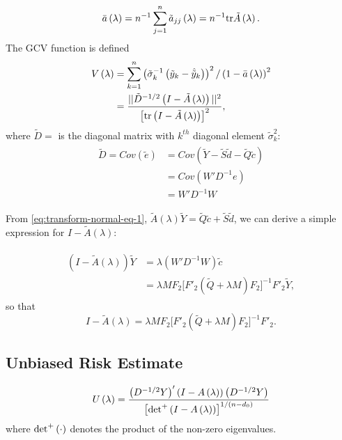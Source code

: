 \documentclass[12pt]{article}
\newcommand{\tildec}{\tilde{c}}
\newcommand{\tildeS}{\tilde{S}}
\newcommand{\tilded}{\tilde{d}}
\newcommand{\tildeY}{\tilde{Y}}
\newcommand{\tildey}{\tilde{y}}
\newcommand{\tildeQ}{\tilde{Q}}
\newcommand{\tildeA}{\tilde{A}}
\theoremstyle{definition}
\begin{document}
\[
\bar{a}\left(\lambda\right) = n^{-1}\sum_{j=1}^{n} \tilde{a}_{jj}\left(\lambda\right) = n^{-1} \textup{tr}\tilde{A}\left(\lambda\right).
\]
The GCV function is defined 
\begin{align}
\begin{split}
V\left(\lambda\right) &=  \sum_{k=1}^{n} \left(\tilde{\sigma}_{k}^{-1} \left(\tildey_k - \hat{\tildey}_k\right) \right)^2/ \left(1-\bar{a}\left(\lambda\right) \right)^2\\
&=\frac{ \vert \vert \tilde{D}^{-1/2}\left(I- \tilde{A}\left(\lambda\right) \right) \vert \vert^2}{\left[ \textup{tr}\left(I- \tilde{A}\left(\lambda\right) \right) \right]^2},
\end{split}
\end{align}
\noindent
where $\tilde{D} = $ is the diagonal matrix with $k^{th}$ diagonal element $\tilde{\sigma}_k^2$:
\begin{align} 
\begin{split} \label{eq:tilde-D}
\tilde{D} = Cov\left(\tilde{e}\right) &= Cov\left( \tildeY - \tildeS \tilded - \tildeQ \tildec \right) \\
&= Cov\left(W'D^{-1} e\right) \\
& = W'D^{-1}W 
\end{split}
\end{align}

From \ref{eq:transform-normal-eq-1}, $\tildeA \left(\lambda\right) \tildeY = \tildeQ \tildec + \tildeS \tilded$, we can derive a simple expression for $I -\tildeA \left(\lambda\right)$:

\begin{align}
\begin{split} \label{eq:I-minus-A}
\left(I -\tildeA \left(\lambda\right)\right)\tildeY &= \lambda \left(W'D^{-1}W\right) \tildec \\
&= \lambda M  F_2\bigg[ F'_2 \left( \tildeQ + \lambda M \right)F_2 \bigg]^{-1} F'_2 \tildeY,
\end{split}
\end{align}
\bigskip
\noindent
so that
\[
I -\tildeA \left(\lambda\right) = \lambda M F_2\bigg[ F'_2 \left( \tildeQ + \lambda M \right)F_2 \bigg]^{-1} F'_2 .
\]
\noindent

\subsection{Unbiased Risk Estimate}
\[
U\left(\lambda\right) = \frac{ \left(D^{-1/2}Y\right)' \left( I - A\left(\lambda\right)\right) \left(D^{-1/2}Y\right)}{\left[\textup{det}^+ \left( I - A\left(\lambda\right)\right) \right]^{1/\left(n-d_0\right)}}
\]
\noindent
where $\textup{det}^+\left(\cdot\right)$ denotes the product of the non-zero eigenvalues.
\end{document}
